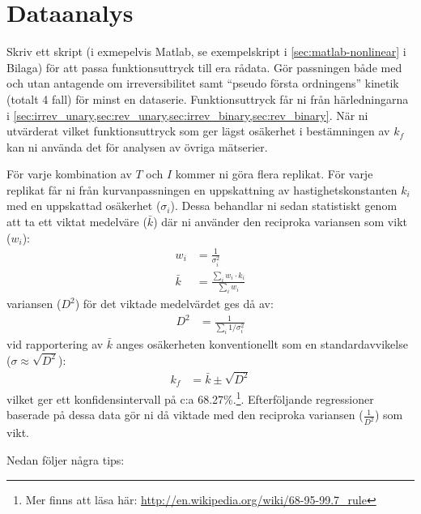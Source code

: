 \section{Dataanalys}
\label{sec:analys}
Skriv ett skript (i exmepelvis Matlab, se exempelskript i
\cref{sec:matlab-nonlinear} i Bilaga) för att passa funktionsuttryck till
era rådata. Gör passningen både med och utan antagende om
irreversibilitet samt ``pseudo första ordningens'' kinetik (totalt 4
fall) för minst en dataserie. Funktionsuttryck får ni från härledningarna
i \cref{sec:irrev_unary,sec:rev_unary,sec:irrev_binary,sec:rev_binary}.
När ni utvärderat vilket funktionsuttryck som ger lägst osäkerhet i
bestämningen av $k_f$ kan ni använda det för analysen av övriga
mätserier.

För varje kombination av $T$ och $I$ kommer ni göra flera replikat. För
varje replikat får ni från kurvanpassningen en uppskattning av
hastighetskonstanten $k_i$ med en uppskattad osäkerhet
($\sigma_i$). Dessa behandlar ni sedan statistiskt genom att ta ett
viktat medelväre ($\bar{k}$) där ni använder den reciproka variansen som
vikt ($w_i$):
\begin{align}
  w_i &= \frac{1}{\sigma_i^2} \\
  \bar{k} &= \frac{\sum_i{w_i \cdot k_i}}{\sum_i{w_i}}
\end{align}
variansen ($D^2$) för det viktade medelvärdet ges då av:
\begin{align}
  D^2 &= \frac{1}{\sum_i 1/\sigma_i^2}
\end{align}
vid rapportering av $\bar{k}$ anges osäkerheten konventionellt som en
standardavvikelse ($\sigma \approx \sqrt{D^2}$):
\begin{align}
  k_f &= \bar{k} \pm \sqrt{D^2}
\end{align}
vilket ger ett konfidensintervall på c:a 68.27\%.\footnote{
Mer finns att läsa här:
\url{http://en.wikipedia.org/wiki/68-95-99.7\_rule}
}. Efterföljande regressioner baserade på dessa
data gör ni då viktade med den reciproka variansen ($\frac{1}{D^2}$) som
vikt.

Nedan följer några tips:

